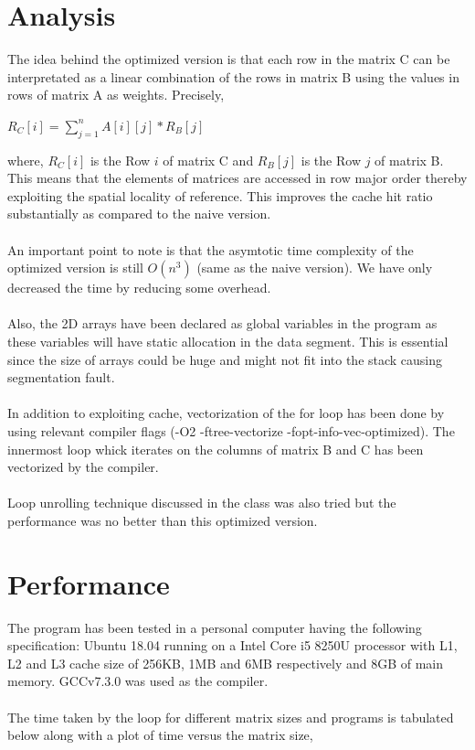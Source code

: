 \documentclass[11pt,a4paper,oneside]{article}
\begin{document}
    \section{Analysis}
    The idea behind the optimized version is that each row in the matrix C can be interpretated as a linear combination of the rows in matrix B using the values in rows of matrix A as weights. Precisely, \\
    \begin{center}
    	$R_C[i] = \sum_{j=1}^{n} A[i][j]*R_B[j]$ \\
    \end{center}
    where, $R_C[i]$ is the Row $i$ of matrix C and $R_B[j]$ is the Row $j$ of matrix B. This means that the elements of matrices are accessed in row major order thereby exploiting the spatial locality of reference. This improves the cache hit ratio substantially as compared to the naive version. \\ \\
    An important point to note is that the asymtotic time complexity of the optimized version is still $O(n^3)$ (same as the naive version). We have only decreased the time by reducing some overhead.\\ \\
    Also, the 2D arrays have been declared as global variables in the program as these variables will have static allocation in the data segment. This is essential since the size of arrays could be huge and might not fit into the stack causing segmentation fault.\\ \\
    In addition to exploiting cache, vectorization of the for loop has been done by using relevant compiler flags (-O2 -ftree-vectorize -fopt-info-vec-optimized). The innermost loop whick iterates on the columns of matrix B and C has been vectorized by the compiler. \\ \\
    Loop unrolling technique discussed in the class was also tried but the performance was no better than this optimized version.
    
    \section{Performance}
    The program has been tested in a personal computer having the following specification: Ubuntu 18.04 running on a Intel Core i5 8250U processor with L1, L2 and L3 cache size of 256KB, 1MB and 6MB respectively and 8GB of main memory. GCCv7.3.0 was used as the compiler. \\ \\
    The time taken by the loop for different matrix sizes and programs is tabulated below along with a plot of time versus the matrix size, \\ \\
    
\end{document}
